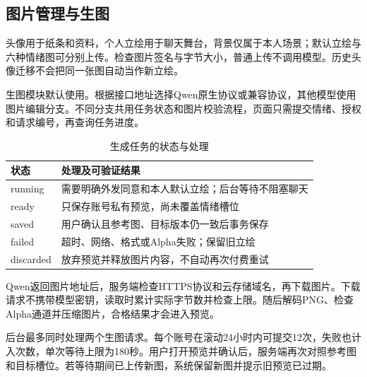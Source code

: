 \subsection*{图片管理与生图}
头像用于纸条和资料，个人立绘用于聊天舞台，背景仅属于本人场景；默认立绘与六种情绪图可分别上传。检查图片签名与字节大小，普通上传不调用模型。历史头像迁移不会把同一张图自动当作新立绘。

生图模块默认使用。根据接口地址选择Qwen原生协议或兼容协议，其他模型使用图片编辑分支。不同分支共用任务状态和图片校验流程，页面只需提交情绪、授权和请求编号，再查询任务进度。

\begin{table}[H]\centering\small
\caption{生成任务的状态与处理}
\begin{tabularx}{\linewidth}{@{}p{25mm}X@{}}\toprule
状态 & 处理及可验证结果 \\ \midrule
running & 需要明确外发同意和本人默认立绘；后台等待不阻塞聊天 \\
ready & 只保存账号私有预览，尚未覆盖情绪槽位 \\
saved & 用户确认且参考图、目标版本仍一致后事务保存 \\
failed & 超时、网络、格式或Alpha失败；保留旧立绘 \\
discarded & 放弃预览并释放图片内容，不自动再次付费重试 \\ \bottomrule
\end{tabularx}\end{table}

Qwen返回图片地址后，服务端检查HTTPS协议和云存储域名，再下载图片。下载请求不携带模型密钥，读取时累计实际字节数并检查上限。随后解码PNG、检查Alpha通道并压缩图片，合格结果才会进入预览。

后台最多同时处理两个生图请求。每个账号在滚动24小时内可提交12次，失败也计入次数，单次等待上限为180秒。用户打开预览并确认后，服务端再次对照参考图和目标槽位。若等待期间已上传新图，系统保留新图并提示旧预览已过期。

